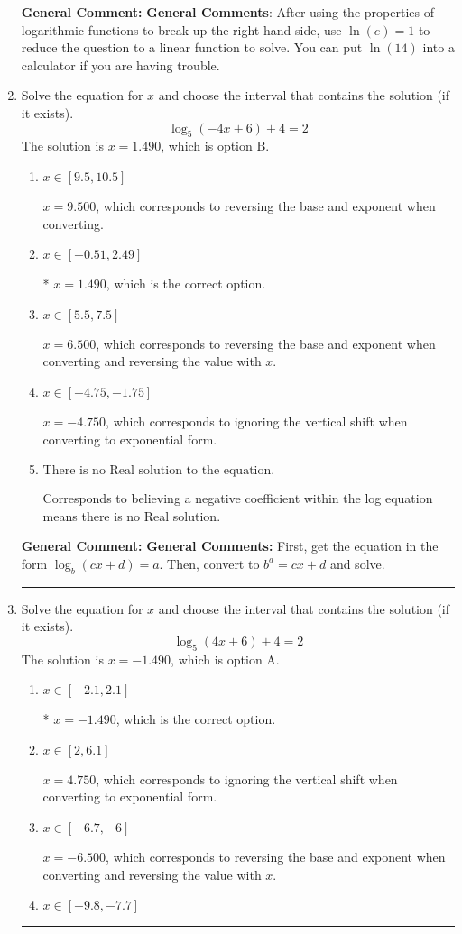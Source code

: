 \documentclass{extbook}[14pt]
\newcommand{\litem}[1]{\item #1

\rule{\textwidth}{0.4pt}}
\begin{document}
\begin{enumerate}
{\textbf{General Comment:} \textbf{General Comments}: After using the properties of logarithmic functions to break up the right-hand side, use $\ln(e) = 1$ to reduce the question to a linear function to solve. You can put $\ln(14)$ into a calculator if you are having trouble.
}
\litem{
Solve the equation for $x$ and choose the interval that contains the solution (if it exists).
\[ \log_{5}{(-4x+6)}+4 = 2 \]The solution is \( x = 1.490 \), which is option B.\begin{enumerate}[label=\Alph*.]
\item \( x \in [9.5, 10.5] \)

$x = 9.500$, which corresponds to reversing the base and exponent when converting.
\item \( x \in [-0.51, 2.49] \)

* $x = 1.490$, which is the correct option.
\item \( x \in [5.5, 7.5] \)

$x = 6.500$, which corresponds to reversing the base and exponent when converting and reversing the value with $x$.
\item \( x \in [-4.75, -1.75] \)

$x = -4.750$, which corresponds to ignoring the vertical shift when converting to exponential form.
\item \( \text{There is no Real solution to the equation.} \)

Corresponds to believing a negative coefficient within the log equation means there is no Real solution.
\end{enumerate}

\textbf{General Comment:} \textbf{General Comments:} First, get the equation in the form $\log_b{(cx+d)} = a$. Then, convert to $b^a = cx+d$ and solve.
}
\litem{
Solve the equation for $x$ and choose the interval that contains the solution (if it exists).
\[ \log_{5}{(4x+6)}+4 = 2 \]The solution is \( x = -1.490 \), which is option A.\begin{enumerate}[label=\Alph*.]
\item \( x \in [-2.1, 2.1] \)

* $x = -1.490$, which is the correct option.
\item \( x \in [2, 6.1] \)

$x = 4.750$, which corresponds to ignoring the vertical shift when converting to exponential form.
\item \( x \in [-6.7, -6] \)

$x = -6.500$, which corresponds to reversing the base and exponent when converting and reversing the value with $x$.
\item \( x \in [-9.8, -7.7] \)


\end{enumerate}}
\end{enumerate}
\end{document}
